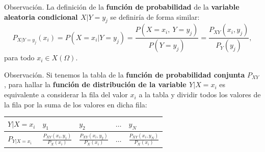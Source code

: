 \documentclass[]{book}
\begin{document}
Observación.
La definición de la \textbf{función de probabilidad} de la \textbf{variable aleatoria condicional \(X|Y=y_j\)} se definiría de forma similar:
\[
P_{X|Y=y_j}(x_i)=P(X=x_i|Y=y_j)=\frac{P(X=x_i,\ Y=y_j)}{P(Y=y_j)}=\frac{P_{XY}(x_i,y_j)}{P_Y(y_j)}, 
\]
para todo \(x_i\in X(\Omega)\).

Observación.
Si tenemos la tabla de la \textbf{función de probabilidad conjunta} \(P_{XY}\), para hallar la \textbf{función de distribución de la variable \(Y|X=x_i\)} es equivalente a considerar la fila del valor \(x_i\) a la tabla y dividir todos los valores de la fila por la suma de los valores en dicha fila:

\begin{longtable}[]{@{}lllll@{}}
\toprule
\begin{minipage}[b]{0.17\columnwidth}\raggedright
\(Y|X=x_i\)\strut
\end{minipage} & \begin{minipage}[b]{0.17\columnwidth}\raggedright
\(y_1\)\strut
\end{minipage} & \begin{minipage}[b]{0.17\columnwidth}\raggedright
\(y_2\)\strut
\end{minipage} & \begin{minipage}[b]{0.17\columnwidth}\raggedright
\(\ldots\)\strut
\end{minipage} & \begin{minipage}[b]{0.17\columnwidth}\raggedright
\(y_N\)\strut
\end{minipage}\tabularnewline
\midrule
\endhead
\begin{minipage}[t]{0.17\columnwidth}\raggedright
\(P_{Y|X=x_i}\)\strut
\end{minipage} & \begin{minipage}[t]{0.17\columnwidth}\raggedright
\(\frac{P_{XY}(x_i,y_1)}{P_X(x_i)}\)\strut
\end{minipage} & \begin{minipage}[t]{0.17\columnwidth}\raggedright
\(\frac{P_{XY}(x_i,y_2)}{P_X(x_i)}\)\strut
\end{minipage} & \begin{minipage}[t]{0.17\columnwidth}\raggedright
\(\ldots\)\strut
\end{minipage} & \begin{minipage}[t]{0.17\columnwidth}\raggedright
\(\frac{P_{XY}(x_i,y_N)}{P_X(x_i)}\)\strut
\end{minipage}\tabularnewline
\bottomrule
\end{longtable}
\end{document}
